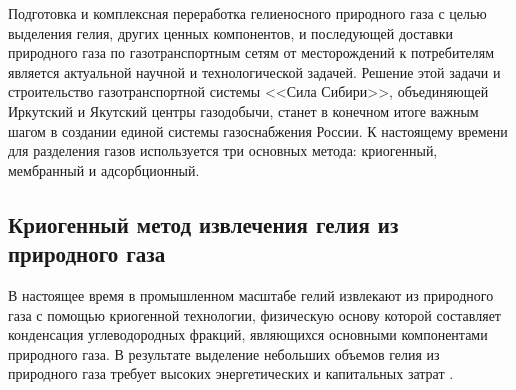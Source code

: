 Подготовка и комплексная переработка гелиеносного природного газа с целью выделения гелия, других ценных компонентов, и последующей доставки природного газа по газотранспортным сетям от месторождений к потребителям является актуальной научной и технологической задачей. Решение этой задачи и строительство газотранспортной системы <<Сила Сибири>>, объединяющей Иркутский и Якутский центры газодобычи, станет в конечном итоге важным шагом в создании единой системы газоснабжения России.
К настоящему времени для разделения газов используется три основных метода: криогенный, мембранный и адсорбционный.



\subsection{Криогенный метод извлечения гелия из природного газа} \label{section_1_1_1}

В настоящее время в промышленном масштабе гелий извлекают из природного газа с помощью криогенной технологии, физическую основу которой составляет конденсация углеводородных фракций, являющихся основными компонентами природного газа.   В результате выделение небольших объемов гелия из природного газа требует высоких энергетических и капитальных  затрат \cite{Andreev, Simonenko}.

